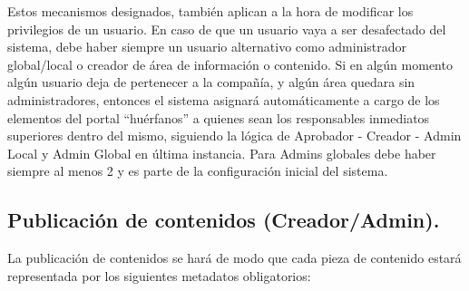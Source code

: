 Estos mecanismos designados, también aplican a la hora de modificar los privilegios de un usuario. En caso de que un usuario vaya a ser desafectado del sistema, debe haber siempre un usuario alternativo como administrador global/local o creador de área de información o contenido. Si en algún momento algún usuario deja de pertenecer a la compañía, y algún área quedara sin administradores, entonces el sistema asignará automáticamente a cargo de los elementos del portal “huérfanos” a quienes sean los responsables inmediatos superiores dentro del mismo, siguiendo la lógica de Aprobador - Creador - Admin Local y Admin Global en última instancia. Para Admins globales debe haber siempre al menos 2 y es parte de la configuración inicial del sistema.

\subsection{Publicación de contenidos (Creador/Admin).}

La publicación de contenidos se hará de modo que cada pieza de contenido estará representada por los siguientes metadatos obligatorios:

